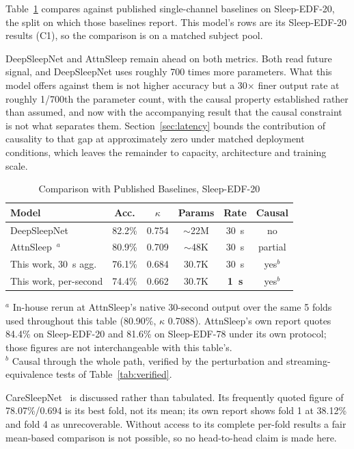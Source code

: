 \documentclass[conference]{IEEEtran}
\begin{document}
Table~\ref{tab:baselines} compares against published single-channel baselines on Sleep-EDF-20, the split on
which those baselines report. This model's rows are its Sleep-EDF-20 results (C1), so the comparison is on a
matched subject pool.

DeepSleepNet and AttnSleep remain ahead on both metrics. Both read future signal, and DeepSleepNet uses
roughly 700 times more parameters. What this model offers against them is not higher accuracy but a
30$\times$ finer output rate at roughly 1/700th the parameter count, with the causal property established
rather than assumed, and now with the accompanying result that the causal constraint is not what separates
them. Section~\ref{sec:latency} bounds the contribution of causality to that gap at approximately zero under
matched deployment conditions, which leaves the remainder to capacity, architecture and training scale.

\begin{table}[t]
\caption{Comparison with Published Baselines, Sleep-EDF-20}
\label{tab:baselines}
\centering
\begin{tabular}{lccccc}
\toprule
Model & Acc. & $\kappa$ & Params & Rate & Causal \\
\midrule
DeepSleepNet~\cite{deepsleepnet} & 82.2\% & 0.754 & $\sim$22M & 30~s & no \\
AttnSleep~\cite{attnsleep}$^{a}$ & 80.9\% & 0.709 & $\sim$48K & 30~s & partial \\
This work, 30~s agg.             & 76.1\% & 0.684 & 30.7K & 30~s & yes$^{b}$ \\
This work, per-second            & 74.4\% & 0.662 & 30.7K & \textbf{1~s} & yes$^{b}$ \\
\bottomrule
\end{tabular}
\begin{flushleft}
\footnotesize
$^{a}$ In-house rerun at AttnSleep's native 30-second output over the same 5 folds used throughout this table
(80.90\%, $\kappa$ 0.7088). AttnSleep's own report quotes 84.4\% on Sleep-EDF-20 and 81.6\% on Sleep-EDF-78
under its own protocol; those figures are not interchangeable with this table's.\\
$^{b}$ Causal through the whole path, verified by the perturbation and streaming-equivalence tests of
Table~\ref{tab:verified}.
\end{flushleft}
\end{table}

CareSleepNet~\cite{caresleepnet} is discussed rather than tabulated. Its frequently quoted figure of
78.07\%/0.694 is its best fold, not its mean; its own report shows fold 1 at 38.12\% and fold 4 as
unrecoverable. Without access to its complete per-fold results a fair mean-based comparison is not possible,
so no head-to-head claim is made here.
\end{document}
